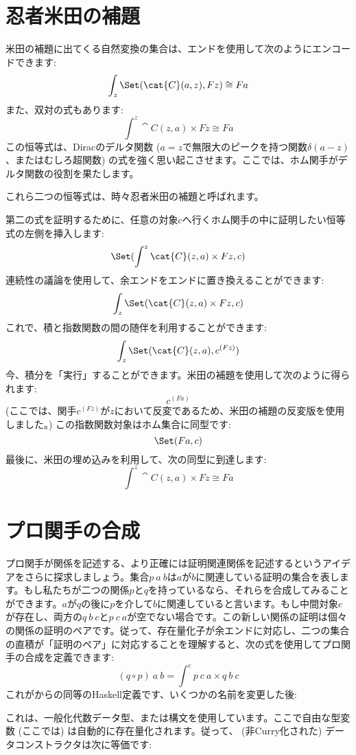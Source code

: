 \section{忍者米田の補題}

米田の補題に出てくる自然変換の集合は、エンドを使用して次のようにエンコードできます: 
\[\int_z \Set(\cat{C}(a, z), F z) \cong F a\]
また、双対の式もあります: 
\[\int^z \cat{C}(z, a)\times{}F z \cong F a\]
この恒等式は、Diracのデルタ関数 ($a = z$で無限大のピークを持つ関数$\delta(a - z)$、またはむしろ超関数) の式を強く思い起こさせます。ここでは、ホム関手がデルタ関数の役割を果たします。

これら二つの恒等式は、時々忍者米田の補題と呼ばれます。

第二の式を証明するために、任意の対象$c$へ行くホム関手の中に証明したい恒等式の左側を挿入します: 
\[\Set(\int^z \cat{C}(z, a)\times{}F z, c)\]
連続性の議論を使用して、余エンドをエンドに置き換えることができます: 
\[\int_z \Set(\cat{C}(z, a)\times{}F z, c)\]
これで、積と指数関数の間の随伴を利用することができます: 
\[\int_z \Set(\cat{C}(z, a), c^{(F z)})\]
今、積分を「実行」することができます。米田の補題を使用して次のように得られます: 
\[c^{(F a)}\]
 (ここでは、関手$c^{(F z)}$が$z$において反変であるため、米田の補題の反変版を使用しました。) 
この指数関数対象はホム集合に同型です: 
\[\Set(F a, c)\]
最後に、米田の埋め込みを利用して、次の同型に到達します: 
\[\int^z \cat{C}(z, a)\times{}F z \cong F a\]

\section{プロ関手の合成}

プロ関手が関係を記述する、より正確には証明関連関係を記述するというアイデアをさらに探求しましょう。集合$p\ a\ b$は$a$が$b$に関連している証明の集合を表します。もし私たちが二つの関係$p$と$q$を持っているなら、それらを合成してみることができます。$a$が$q$の後に$p$を介して$b$に関連していると言います。もし中間対象$c$が存在し、両方の$q\ b\ c$と$p\ c\ a$が空でない場合です。この新しい関係の証明は個々の関係の証明のペアです。従って、存在量化子が余エンドに対応し、二つの集合の直積が「証明のペア」に対応することを理解すると、次の式を使用してプロ関手の合成を定義できます: 
\[(q \circ p)\ a\ b = \int^c p\ c\ a\times{}q\ b\ c\]
これがからの同等のHaskell定義です、いくつかの名前を変更した後: 

これは、一般化代数データ型、または構文を使用しています。ここで自由な型変数 (ここでは) は自動的に存在量化されます。従って、 (非Curry化された) データコンストラクタは次に等価です: 

